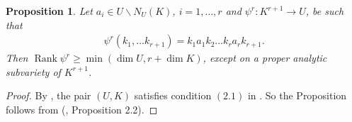 \documentclass[11pt,a4paper]{amsart}
\DeclareMathOperator{\rank}{\text{Rank}}
\newtheorem{proposition}[theorem]{Proposition}
\theoremstyle{definition}
\numberwithin{equation}{section}
\begin{document}
\begin{proposition}  \label{Zonel-proposition}
Let $ a_i\in U\backslash N_U(K)$, $i=1,\dots, r$ and   $\psi^r: K^{r+1}\longrightarrow U$, be such that  \begin{align*}
\psi^r (k_1,\dots k_{r+1}) = k_1a_1k_2\dots k_ra_rk_{r+1} .
\end{align*}
Then $ \rank \psi^r \geq \min\left(\dim U, r+\dim K\right)$, 
except on a proper analytic subvariety of $K^{r+1}$.
\end{proposition}
\begin{proof} By 
\cite{Wolf3}, the pair $(U,K)$ satisfies condition $(2.1)$ in \cite{RaZonal}. So the Proposition follows from (\cite{RaZonal}, Proposition 2.2).
\end{proof}
\end{document}

